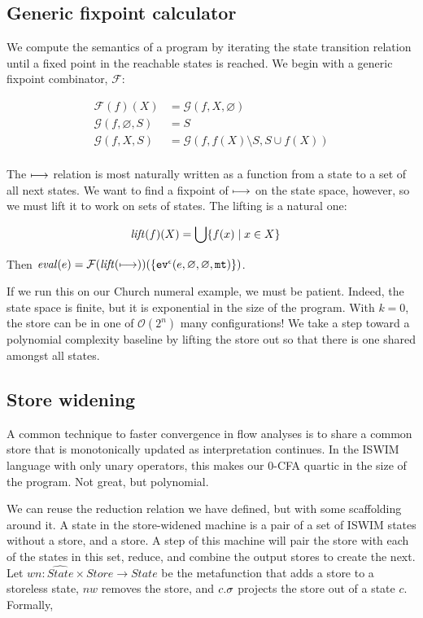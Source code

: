\documentclass[preprint,onecolumn,9pt]{sigplanconf} %
\begin{document}
\subsection{Generic fixpoint calculator}
\label{sec:fixpoint}

We compute the semantics of a program by iterating the state
transition relation until a fixed point in the reachable states is
reached. We begin with a generic fixpoint combinator, ${\mathcal F}$:

\begin{align*}
{\mathcal F}(f)(X) &= {\mathcal G}(f, X, \varnothing) \\
{\mathcal G}(f, \varnothing, S) &= S \\
{\mathcal G}(f, X, S) &= {\mathcal G}(f, f(X) \setminus S, S \cup f(X)) \\
\end{align*}

The $\machstep$ relation is most naturally written as a function from
a state to a set of all next states. We want to find a fixpoint of
$\machstep$ on the state space, however, so we must lift it to work on
sets of states. The lifting is a natural one:

\begin{align*}
\lift(f)(X) &= \bigcup\{f(x) \mid x \in X\}
\end{align*}

Then $\eval(e) = {\mathcal F}(\lift(\machstep))(\{\ev[^\mtcntr]{e, \varnothing, \varnothing, \kmt}\})$.

If we run this on our Church numeral example, we must be
patient. Indeed, the state space is finite, but it is exponential in
the size of the program. With $k = 0$, the store can be in one of ${\mathcal
  O}(2^n)$ many configurations! We take a step toward a polynomial
complexity baseline by lifting the store out so that there is one
shared amongst all states.

\subsection{Store widening}
\label{sec:storewiden}

A common technique to faster convergence in flow analyses is to share
a common store that is monotonically updated as interpretation
continues. In the ISWIM language with only unary operators, this makes
our 0-CFA quartic in the size of the program. Not great, but
polynomial.

We can reuse the reduction relation we have defined, but with some
scaffolding around it. A state in the store-widened machine is a pair
of a set of ISWIM states without a store, and a store. A step of this
machine will pair the store with each of the states in this set,
reduce, and combine the output stores to create the next. Let $wn :
\widehat{State} \times Store \to State$ be the metafunction that adds
a store to a storeless state, $nw$ removes the store, and $c.\msto$
projects the store out of a state $c$. Formally,
\end{document}
